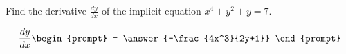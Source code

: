 \documentclass{ximera}
\author{Gregory Hartman \and Matthew Carr}
\begin{document}
\begin{exercise}



Find the derivative $\frac{dy}{dx}$ of the implicit equation $x^4+y^2+y=7$.

\[
\frac{dy}{dx}
\begin{prompt}
= \answer{-\frac{4x^3}{2y+1}}
\end{prompt}
\]

\end{exercise}
\end{document}
